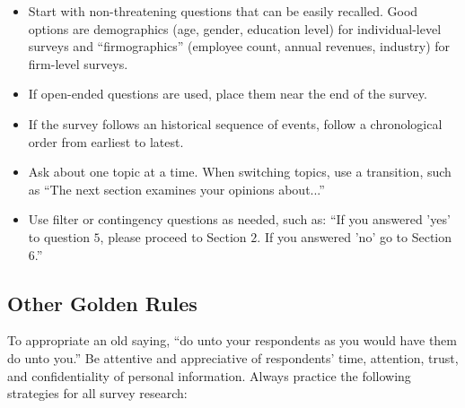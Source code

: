 \begin{itemize}
	\item Start with non-threatening questions that can be easily recalled. Good options are	demographics (age, gender, education level) for individual-level surveys and ``firmographics'' (employee count, annual revenues, industry) for firm-level surveys.

	\item If open-ended questions are used, place them near the end of the survey.

	\item If the survey follows an historical sequence of events, follow a chronological order from earliest to latest.

	\item Ask about one topic at a time. When switching topics, use a transition, such as ``The next section examines your opinions about...''

	\item Use filter or contingency questions as needed, such as: ``If you answered 'yes' to question $ 5 $, please proceed to Section $ 2 $. If you answered 'no' go to Section $ 6 $.''
\end{itemize}

\subsection{Other Golden Rules}

To appropriate an old saying, ``do unto your respondents as you would have them do unto you.'' Be attentive and appreciative of respondents' time, attention, trust, and confidentiality of personal information. Always practice the following strategies for all survey research:

